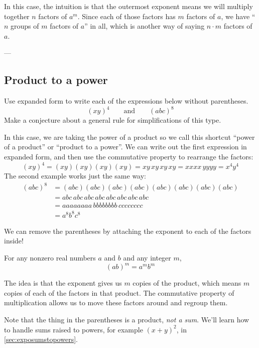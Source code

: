 In this case, the intuition is that the outermost exponent means we will multiply together $n$ factors of $a^m$. Since each of those factors has $m$ factors of $a$, we have ``$n$ groups of $m$ factors of $a$'' in all, which is another way of saying $n \cdot m$ factors of $a$.

\begin{boxedex}
---
\end{boxedex}


\subsection{Product to a power}

\begin{boxedexplore}
Use expanded form to write each of the expressions below without parentheses.
\[(xy)^4 \qquad\text{and}\qquad (abc)^8\]
Make a conjecture about a general rule for simplifications of this type.
\end{boxedexplore}

In this case, we are taking the power of a product so we call this shortcut ``power of a product'' or ``product to a power''. We can write out the first expression in expanded form, and then use the commutative property to rearrange the factors:
\[(xy)^4 = (xy)(xy)(xy)(xy) = xy\,xy\,xy\,xy = xxxx\,yyyy = x^4y^4\]
The second example works just the same way:
\[
\begin{aligned}(abc)^8 &= (abc)(abc)(abc)(abc)(abc)(abc)(abc)(abc)
\\ &= abc\,abc\,abc\,abc\,abc\,abc\,abc\,abc
\\ &= aaaaaaaa\,bbbbbbbb\,cccccccc
\\ &= a^8b^8c^8
\end{aligned}\]

We can remove the parentheses by attaching the exponent to each of the factors inside!

\begin{boxeddef}
For any nonzero real numbers $a$ and $b$ and any integer $m$, \[(ab)^m = a^m b^m\]
\end{boxeddef}

The idea is that the exponent gives us $m$ copies of the product, which means $m$ copies of each of the factors in that product. The commutative property of multiplication allows us to move these factors around and regroup them.

Note that the thing in the parentheses is a product, \textit{not a sum}. We'll learn how to handle sums raised to powers, for example $(x+y)^2$, in \cref{sec:exposumstopowers}.

